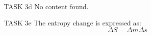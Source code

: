 TASK 3d  
No content found.

TASK 3e  
The entropy change is expressed as:  
\[
\Delta S = \Delta m \Delta s
\]